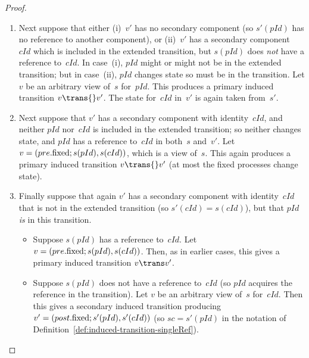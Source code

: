 \begin{proof}
\begin{enumerate}
\begin{enumerate}
\item Next suppose that either (i)~$v'$ has no secondary component (so
  $s'(pId)$ has no reference to another component), or (ii)~$v'$ has a
  secondary component~$cId$ which is included in the extended transition, but
  $s(pId)$ does \emph{not} have a reference to~$cId$.  In case~(i), $pId$
  might or might not be in the extended transition; but in case~(ii), $pId$
  changes state so must be in the transition.  Let $v$ be an arbitrary view
  of~$s$ for~$pId$.  This produces a primary induced transition $v \trans{}
  v'$.  The state for~$cId$ in~$v'$ is again taken from~$s'$.


\item Next suppose that $v'$ has a secondary component with identity~$cId$,
  and neither $pId$ nor~$cId$ is included in the extended transition; so
  neither changes state, and $pId$ has a reference to~$cId$ in both~$s$
  and~$v'$.  Let $v = (pre.\mathrm{fixed}; s(pId), s(cId))$, which is a view of~$s$.
  This again produces a primary induced transition $v \trans{} v'$ (at most
  the fixed processes change state).

\item Finally suppose that again $v'$ has a secondary component with
  identity~$cId$ that is not in the extended transition (so $s'(cId) =
  s(cId)$), but that $pId$ \emph{is} in this transition.
  \begin{itemize}
  \item Suppose $s(pId)$ has a reference to~$cId$.  Let $v =
    (pre.\fixed;\linebreak[1] s(pId), s(cId))$.  Then, as in earlier cases,
    this gives a primary induced transition $v \trans v'$.

  \item Suppose $s(pId)$ does not have a reference to~$cId$ (so $pId$ acquires
    the reference in the transition).  Let $v$ be an arbitrary view of~$s$
    for~$cId$.  Then this gives a secondary induced transition producing~$v' =
    (post.\mathrm{fixed}; s'(pId), s'(cId))$ (so $sc = s'(pId)$ in the notation of
    Definition~\ref{def:induced-transition-singleRef}).
  \end{itemize}
\end{enumerate}


\end{enumerate}
\end{proof}
